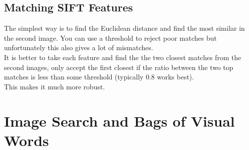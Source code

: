 \documentclass{article}
\begin{document}
	\subsection*{Matching SIFT Features}
	The simplest way is to find the Euclidean distance and find the most similar in the second image. You can use a threshold to reject poor matches but unfortunately this also gives a lot of mismatches.\\
	It is better to take each feature and find the the two closest matches from the second images, only accept the first closest if the ratio between the two top matches is less than some threshold (typically 0.8 works best).\\
	This makes it much more robust.
	
	\newpage
	\section*{Image Search and Bags of Visual Words}
	\pagestyle{headings}
	
\end{document}
